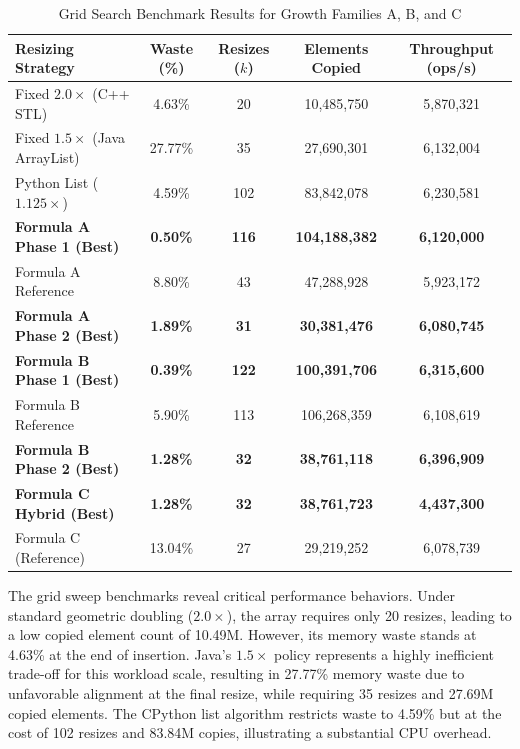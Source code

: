 \begin{table}[H]
\centering
\caption{Grid Search Benchmark Results for Growth Families A, B, and C}
\label{tab:grid_search_results}
\begin{tabularx}{\linewidth}{LCCCC}
\toprule
\textbf{Resizing Strategy} & \textbf{Waste (\%)} & \textbf{Resizes ($k$)} & \textbf{Elements Copied} & \textbf{Throughput (ops/s)} \\
\midrule
Fixed $2.0\times$ (C++ STL) & 4.63\% & 20 & 10,485,750 & 5,870,321 \\
Fixed $1.5\times$ (Java ArrayList) & 27.77\% & 35 & 27,690,301 & 6,132,004 \\
Python List ($1.125\times$) & 4.59\% & 102 & 83,842,078 & 6,230,581 \\
\midrule
\textbf{Formula A Phase 1 (Best)} & \textbf{0.50\%} & \textbf{116} & \textbf{104,188,382} & \textbf{6,120,000} \\
Formula A Reference & 8.80\% & 43 & 47,288,928 & 5,923,172 \\
\textbf{Formula A Phase 2 (Best)} & \textbf{1.89\%} & \textbf{31} & \textbf{30,381,476} & \textbf{6,080,745} \\
\midrule
\textbf{Formula B Phase 1 (Best)} & \textbf{0.39\%} & \textbf{122} & \textbf{100,391,706} & \textbf{6,315,600} \\
Formula B Reference & 5.90\% & 113 & 106,268,359 & 6,108,619 \\
\textbf{Formula B Phase 2 (Best)} & \textbf{1.28\%} & \textbf{32} & \textbf{38,761,118} & \textbf{6,396,909} \\
\midrule
\textbf{Formula C Hybrid (Best)} & \textbf{1.28\%} & \textbf{32} & \textbf{38,761,723} & \textbf{4,437,300} \\
Formula C (Reference) & 13.04\% & 27 & 29,219,252 & 6,078,739 \\
\bottomrule
\end{tabularx}
\end{table}

The grid sweep benchmarks reveal critical performance behaviors. Under standard 
geometric doubling ($2.0\times$), the array requires only 20 resizes, leading to 
a low copied element count of 10.49M. However, its memory waste stands at 
4.63\% at the end of insertion. Java's $1.5\times$ policy represents a highly 
inefficient trade-off for this workload scale, resulting in 27.77\% memory 
waste due to unfavorable alignment at the final resize, while requiring 35 
resizes and 27.69M copied elements. The CPython list algorithm restricts waste 
to 4.59\% but at the cost of 102 resizes and 83.84M copies, illustrating a 
substantial CPU overhead.

